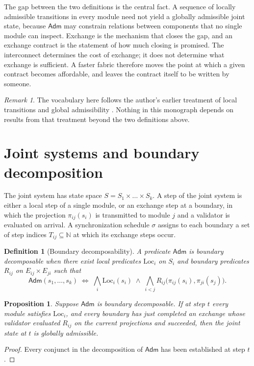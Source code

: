 \documentclass[11pt,openany]{book}
\newtheorem{definition}{Definition}[chapter]
\newtheorem{proposition}{Proposition}[chapter]
\theoremstyle{remark}
\newtheorem{remark}{Remark}[chapter]
\newcommand{\Adm}{\mathsf{Adm}}
\begin{document}
The gap between the two definitions is the central fact. A sequence of locally admissible transitions in every module need not yield a globally admissible joint state, because $\Adm$ may constrain relations between components that no single module can inspect. Exchange is the mechanism that closes the gap, and an exchange contract is the statement of how much closing is promised. The interconnect determines the cost of exchange; it does not determine what exchange is sufficient. A faster fabric therefore moves the point at which a given contract becomes affordable, and leaves the contract itself to be written by someone.

\begin{remark}
The vocabulary here follows the author's earlier treatment of local transitions and global admissibility \cite{flyxion-local}. Nothing in this monograph depends on results from that treatment beyond the two definitions above.
\end{remark}

\section{Joint systems and boundary decomposition}

The joint system has state space $S=S_1\times\dots\times S_k$. A step of the joint system is either a local step of a single module, or an exchange step at a boundary, in which the projection $\pi_{ij}(s_i)$ is transmitted to module $j$ and a validator is evaluated on arrival. A synchronization schedule $\sigma$ assigns to each boundary a set of step indices $T_{ij}\subseteq\mathbb{N}$ at which its exchange steps occur.

\begin{definition}[Boundary decomposability]
A predicate $\Adm$ is boundary decomposable when there exist local predicates $\mathrm{Loc}_i$ on $S_i$ and boundary predicates $R_{ij}$ on $E_{ij}\times E_{ji}$ such that
\[
\Adm(s_1,\dots,s_k)\;\Longleftrightarrow\;\bigwedge_{i}\mathrm{Loc}_i(s_i)\;\wedge\;\bigwedge_{i<j}R_{ij}\bigl(\pi_{ij}(s_i),\pi_{ji}(s_j)\bigr).
\]
\end{definition}

\begin{proposition}\label{prop:decomp}
Suppose $\Adm$ is boundary decomposable. If at step $t$ every module satisfies $\mathrm{Loc}_i$, and every boundary has just completed an exchange whose validator evaluated $R_{ij}$ on the current projections and succeeded, then the joint state at $t$ is globally admissible.
\end{proposition}
\begin{proof}
Every conjunct in the decomposition of $\Adm$ has been established at step $t$.
\end{proof}
\end{document}

